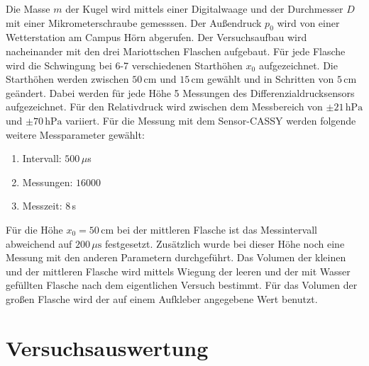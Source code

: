 \documentclass[a4paper, 12pt]{scrartcl}
\begin{document}
Die Masse $m$ der Kugel wird mittels einer Digitalwaage und der Durchmesser $D$ mit einer Mikrometerschraube gemesssen. Der Außendruck $p_0$ wird von einer Wetterstation am Campus Hörn abgerufen. Der Versuchsaufbau wird nacheinander mit den drei Mariottschen Flaschen aufgebaut. Für jede Flasche wird die Schwingung bei 6-7 verschiedenen Starthöhen $x_0$ aufgezeichnet. Die Starthöhen werden zwischen $50 \, \mathrm{cm}$ und $15 \, \mathrm{cm}$ gewählt und in Schritten von $5 \, \mathrm{cm}$ geändert. Dabei werden für jede Höhe 5 Messungen des Differenzialdrucksensors aufgezeichnet. Für den Relativdruck wird zwischen dem Messbereich von $\pm 21 \, \mathrm{hPa}$ und $\pm 70 \, \mathrm{hPa}$ variiert. Für die Messung mit dem Sensor-CASSY werden folgende weitere Messparameter gewählt:
\begin{enumerate}[-]
\setlength{\itemsep}{-5pt} 
\item Intervall: $500\,\mu$s 
\item Messungen: $16000$
\item Messzeit: $8\,$s
\end{enumerate}
Für die Höhe $x_0 = 50 \, \mathrm{cm}$ bei der mittleren Flasche ist das Messintervall abweichend auf $200 \,\mu\mathrm s$ festgesetzt. Zusätzlich wurde bei dieser Höhe noch eine Messung mit den anderen Parametern durchgeführt. Das Volumen der kleinen und der mittleren Flasche wird mittels Wiegung der leeren und der mit Wasser gefüllten Flasche nach dem eigentlichen Versuch bestimmt. Für das Volumen der großen Flasche wird der auf einem Aufkleber angegebene Wert benutzt. 


\section{Versuchsauswertung}
\end{document}
